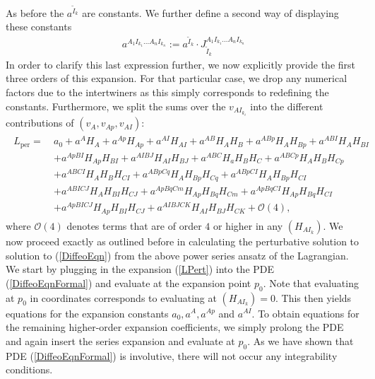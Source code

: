 As before the $a^{\tilde{I}_k}$ are constants.
We further define a second way of displaying these constants
\begin{align}
    a^{A_1I_{k_1}...A_nI_{k_n}} := a^{\tilde{I}_k} \cdot J_{\tilde{I}_k}^{A_1I_{k_1}...A_nI_{k_n}}
\end{align}
In order to clarify this last expression further, we now explicitly provide the first three orders of this expansion. For that particular case, we drop any numerical factors due to the intertwiners as this simply corresponds to redefining the constants. Furthermore, we split the sums over the $v_{AI_{k_i}}$ into the different contributions of $(v_A,v_{Ap},v_{AI})$:
\begin{align}\label{LPert}
\begin{aligned}
    L_{\text{per}} = \  &a_0 + a^A H_A + a^{Ap} H_{Ap} + a^{AI}H_{AI} + a^{AB} H_{A}H_{B} + a^{ABp}H_A H_{Bp} + a^{ABI} H_{A} H_{BI}\\
    &+a^{ApBI}H_{Ap} H_{BI} + a^{AIBJ} H_{AI}H_{BJ} + a^{ABC} H_a H_B H_C 
    + a^{ABCp} H_A H_B H_{Cp} \\
    &+a^{ABCI} H_A H_B H_{CI} + a^{ABpCq} H_{A}H_{Bp}H_{Cq} + a^{ABpCI} H_A H_{Bp} H_{CI}\\
    &+ a^{ABICJ} H_A H_{BI}H_{CJ} 
    + a^{ApBqCm} H_{Ap} H_{Bq} H_{Cm}+ a^{ApBq CI} H_{Ap} H_{Bq} H_{CI}\\
    &+ a^{Ap BI CJ} H_{Ap} H_{BI} H_{CJ} + a^{AIBJCK} H_{AI} H_{BJ} H_{CK} + \mathcal{O}(4),
\end{aligned}
\end{align}
where $\mathcal{O}(4)$ denotes terms that are of order $4$ or higher in any $(H_{AI_k})$. We now proceed exactly as outlined before in calculating the perturbative solution to solution to (\ref{DiffeoEqn}) from the above power series ansatz of the Lagrangian. We start by plugging in the expansion (\ref{LPert}) into the PDE (\ref{DiffeoEqnFormal}) and evaluate at the expansion point $p_0$. Note that evaluating at $p_0$ in coordinates corresponds to evaluating at $(H_{AI_k})=0$. This then yields equations for the expansion constants $a_0, a^A, a^{Ap}$ and $a^{AI}$. To obtain equations for the remaining higher-order expansion coefficients, we simply prolong the PDE and again insert the series expansion and evaluate at $p_0$. As we have shown that PDE (\ref{DiffeoEqnFormal}) is involutive, there will not occur any integrability conditions.

